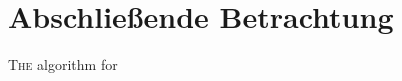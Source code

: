 \section{Abschließende Betrachtung}




\ifpdf
    \graphicspath{{5_konzept/figures/PNG/}{5_konzept/figures/PDF/}{5_konzept/figures/}}
\else
    \graphicspath{{5_konzept/figures/EPS/}{5_konzept/figures/}}
\fi

\lettrine{T}{he} algorithm for

\newpage\thispagestyle{empty}
